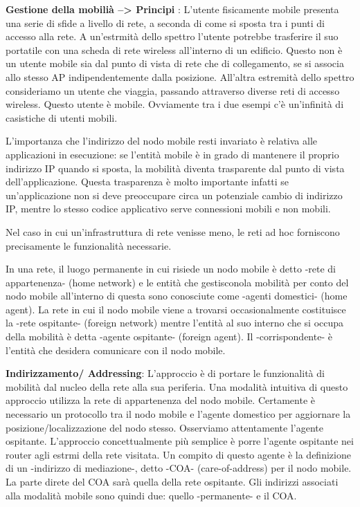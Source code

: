 \documentclass[a4paper,10pt]{article} %
\renewcommand{\b}[1]{%
    {\textbf{#1}}}
\begin{document}
\b{ Gestione della mobilià --> Principi }: L'utente fisicamente mobile presenta una serie di sfide a livello di rete, a seconda di come si sposta tra i punti di accesso alla rete. A un'estrmità dello spettro l'utente potrebbe trasferire il suo portatile con una scheda di rete wireless all'interno di un edificio. Questo non è un utente mobile sia dal punto di vista di rete che di collegamento, se si associa allo stesso AP indipendentemente dalla posizione. All'altra estremità dello spettro consideriamo un utente che viaggia, passando attraverso diverse reti di accesso wireless. Questo utente è mobile. Ovviamente tra i due esempi c'è un'infinità di casistiche di utenti mobili.

L'importanza che l'indirizzo del nodo mobile resti invariato è relativa alle applicazioni in esecuzione: se l'entità mobile è in grado di mantenere il proprio indirizzo IP quando si sposta, la mobilità diventa trasparente dal punto di vista dell'applicazione. Questa trasparenza è molto importante infatti se un'applicazione non si deve preoccupare circa un potenziale cambio di indirizzo IP, mentre lo stesso codice applicativo serve connessioni mobili e non mobili.

Nel caso in cui un'infrastruttura di rete venisse meno, le reti ad hoc forniscono precisamente le funzionalità necessarie.

In una rete, il luogo permanente in cui risiede un nodo mobile è detto -rete di appartenenza- (home network) e le entità che gestisconola mobilità per conto del nodo mobile all'interno di questa sono conosciute come -agenti domestici- (home agent). La rete in cui il nodo mobile viene a trovarsi occasionalmente costituisce la -rete ospitante- (foreign network) mentre l'entità al suo interno che si occupa della mobilità è detta -agente ospitante- (foreign agent). Il -corrispondente- è l'entità che desidera comunicare con il nodo mobile.

\b{ Indirizzamento/ Addressing}: L'approccio è di portare le funzionalità di mobilità dal nucleo della rete alla sua periferia. Una modalità intuitiva di questo approccio utilizza la rete di appartenenza del nodo mobile. Certamente è necessario un protocollo tra il nodo mobile e l'agente domestico per aggiornare la posizione/localizzazione del nodo stesso. Osserviamo attentamente l'agente ospitante. L'approccio concettualmente più semplice è porre l'agente ospitante nei router agli estrmi della rete visitata. Un compito di questo agente è la definizione di un -indirizzo di mediazione-, detto -COA- (care-of-address) per il nodo mobile. La parte direte del COA sarà quella della rete ospitante. Gli indirizzi associati alla modalità mobile sono quindi due: quello -permanente- e il COA.
\end{document}
